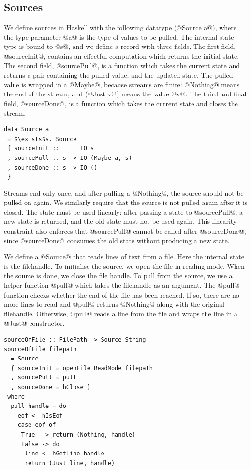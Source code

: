\subsection{Sources}

We define sources in Haskell with the following datatype (@Source a@), where the type parameter @a@ is the type of values to be pulled.
The internal state type is bound to @s@, and we define a record with three fields.
The first field, @sourceInit@, contains an effectful computation which returns the initial state.
The second field, @sourcePull@, is a function which takes the current state and returns a pair containing the pulled value, and the updated state.
The pulled value is wrapped in a @Maybe@, because streams are finite: @Nothing@ means the end of the stream, and (@Just v@) means the value @v@.
The third and final field, @sourceDone@, is a function which takes the current state and closes the stream.

\begin{lstlisting}[mathescape=true]
data Source a
 = $\exists$s. Source
 { sourceInit ::      IO s
 , sourcePull :: s -> IO (Maybe a, s)
 , sourceDone :: s -> IO ()
 }
\end{lstlisting}

Streams end only once, and after pulling a @Nothing@, the source should not be pulled on again.
We similarly require that the source is not pulled again after it is closed.
The state must be used linearly: after passing a state to @sourcePull@, a new state is returned, and the old state must not be used again.
This linearity constraint also enforces that @sourcePull@ cannot be called after @sourceDone@, since @sourceDone@ consumes the old state without producing a new state.

We define a @Source@ that reads lines of text from a file.
Here the internal state is the filehandle.
To initialise the source, we open the file in reading mode.
When the source is done, we close the file handle.
To pull from the source, we use a helper function @pull@ which takes the filehandle as an argument.
The @pull@ function checks whether the end of the file has been reached.
If so, there are no more lines to read and @pull@ returns @Nothing@ along with the original filehandle.
Otherwise, @pull@ reads a line from the file and wraps the line in a @Just@ constructor.

\begin{lstlisting}
sourceOfFile :: FilePath -> Source String
sourceOfFile filepath
  = Source
  { sourceInit = openFile ReadMode filepath
  , sourcePull = pull
  , sourceDone = hClose }
 where
  pull handle = do
    eof <- hIsEof
    case eof of
     True  -> return (Nothing, handle)
     False -> do
      line <- hGetLine handle
      return (Just line, handle)
\end{lstlisting}

